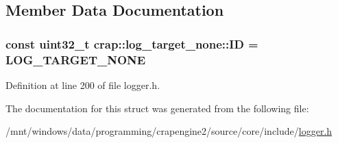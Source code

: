 \subsection{Member Data Documentation}
\hypertarget{structcrap_1_1log__target__none_a18e17216de74467e62adc28d1a86c941}{
\subsubsection[{I\+D}]{\setlength{\rightskip}{0pt plus 5cm}const uint32\+\_\+t crap\+::log\+\_\+target\+\_\+none\+::\+I\+D = {\bf L\+O\+G\+\_\+\+T\+A\+R\+G\+E\+T\+\_\+\+N\+O\+N\+E}\hspace{0.3cm}{\ttfamily [static]}}}\label{structcrap_1_1log__target__none_a18e17216de74467e62adc28d1a86c941}


Definition at line 200 of file logger.\+h.



The documentation for this struct was generated from the following file\+:\begin{DoxyCompactItemize}
\item 
/mnt/windows/data/programming/crapengine2/source/core/include/\hyperlink{logger_8h}{logger.\+h}\end{DoxyCompactItemize}

